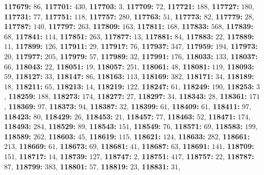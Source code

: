 \textsf{\bfseries 117679:} $86$, \textsf{\bfseries 117701:} $430$, \textsf{\bfseries 117703:} $3$, \textsf{\bfseries 117709:} $72$, \textsf{\bfseries 117721:} $188$, \textsf{\bfseries 117727:} $180$, \textsf{\bfseries 117731:} $77$, \textsf{\bfseries 117751:} $118$, \textsf{\bfseries 117757:} $280$, \textsf{\bfseries 117763:} $51$, \textsf{\bfseries 117773:} $82$, \textsf{\bfseries 117779:} $28$, \textsf{\bfseries 117787:} $140$, \textsf{\bfseries 117797:} $263$, \textsf{\bfseries 117809:} $163$, \textsf{\bfseries 117811:} $168$, \textsf{\bfseries 117833:} $568$, \textsf{\bfseries 117839:} $68$, \textsf{\bfseries 117841:} $114$, \textsf{\bfseries 117851:} $263$, \textsf{\bfseries 117877:} $13$, \textsf{\bfseries 117881:} $84$, \textsf{\bfseries 117883:} $22$, \textsf{\bfseries 117889:} $11$, \textsf{\bfseries 117899:} $126$, \textsf{\bfseries 117911:} $29$, \textsf{\bfseries 117917:} $76$, \textsf{\bfseries 117937:} $347$, \textsf{\bfseries 117959:} $194$, \textsf{\bfseries 117973:} $20$, \textsf{\bfseries 117977:} $205$, \textsf{\bfseries 117979:} $57$, \textsf{\bfseries 117989:} $32$, \textsf{\bfseries 117991:} $176$, \textsf{\bfseries 118033:} $133$, \textsf{\bfseries 118037:} $66$, \textsf{\bfseries 118043:} $22$, \textsf{\bfseries 118051:} $19$, \textsf{\bfseries 118057:} $251$, \textsf{\bfseries 118061:} $48$, \textsf{\bfseries 118081:} $119$, \textsf{\bfseries 118093:} $59$, \textsf{\bfseries 118127:} $33$, \textsf{\bfseries 118147:} $86$, \textsf{\bfseries 118163:} $113$, \textsf{\bfseries 118169:} $382$, \textsf{\bfseries 118171:} $34$, \textsf{\bfseries 118189:} $18$, \textsf{\bfseries 118211:} $65$, \textsf{\bfseries 118213:} $14$, \textsf{\bfseries 118219:} $122$, \textsf{\bfseries 118247:} $61$, \textsf{\bfseries 118249:} $190$, \textsf{\bfseries 118253:} $3$, \textsf{\bfseries 118259:} $188$, \textsf{\bfseries 118273:} $174$, \textsf{\bfseries 118277:} $27$, \textsf{\bfseries 118297:} $34$, \textsf{\bfseries 118343:} $28$, \textsf{\bfseries 118361:} $171$, \textsf{\bfseries 118369:} $97$, \textsf{\bfseries 118373:} $94$, \textsf{\bfseries 118387:} $32$, \textsf{\bfseries 118399:} $61$, \textsf{\bfseries 118409:} $61$, \textsf{\bfseries 118411:} $97$, \textsf{\bfseries 118423:} $80$, \textsf{\bfseries 118429:} $26$, \textsf{\bfseries 118453:} $21$, \textsf{\bfseries 118457:} $77$, \textsf{\bfseries 118463:} $52$, \textsf{\bfseries 118471:} $174$, \textsf{\bfseries 118493:} $284$, \textsf{\bfseries 118529:} $89$, \textsf{\bfseries 118543:} $151$, \textsf{\bfseries 118549:} $76$, \textsf{\bfseries 118571:} $69$, \textsf{\bfseries 118583:} $199$, \textsf{\bfseries 118589:} $262$, \textsf{\bfseries 118603:} $45$, \textsf{\bfseries 118619:} $115$, \textsf{\bfseries 118621:} $124$, \textsf{\bfseries 118633:} $282$, \textsf{\bfseries 118661:} $213$, \textsf{\bfseries 118669:} $61$, \textsf{\bfseries 118673:} $69$, \textsf{\bfseries 118681:} $41$, \textsf{\bfseries 118687:} $63$, \textsf{\bfseries 118691:} $141$, \textsf{\bfseries 118709:} $151$, \textsf{\bfseries 118717:} $14$, \textsf{\bfseries 118739:} $127$, \textsf{\bfseries 118747:} $2$, \textsf{\bfseries 118751:} $417$, \textsf{\bfseries 118757:} $22$, \textsf{\bfseries 118787:} $87$, \textsf{\bfseries 118799:} $383$, \textsf{\bfseries 118801:} $57$, \textsf{\bfseries 118819:} $23$, \textsf{\bfseries 118831:} $31$, 
